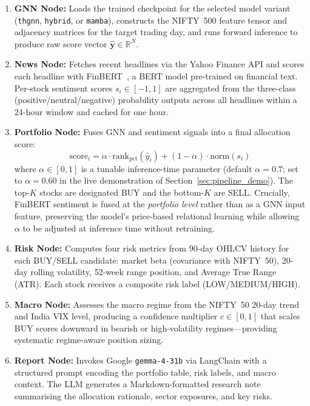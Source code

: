 \documentclass[a4paper,11pt]{report}
\begin{document}
\begin{enumerate}
    \item \textbf{GNN Node:} Loads the trained checkpoint for the selected model variant (\texttt{thgnn}, \texttt{hybrid}, or \texttt{mamba}), constructs the NIFTY~500 feature tensor and adjacency matrices for the target trading day, and runs forward inference to produce raw score vector $\hat{\mathbf{y}} \in \mathbb{R}^N$.

    \item \textbf{News Node:} Fetches recent headlines via the Yahoo Finance API and scores each headline with FinBERT~\cite{araci2019finbert}, a BERT model pre-trained on financial text. Per-stock sentiment scores $s_i \in [-1,1]$ are aggregated from the three-class (positive/neutral/negative) probability outputs across all headlines within a 24-hour window and cached for one hour.

    \item \textbf{Portfolio Node:} Fuses GNN and sentiment signals into a final allocation score:
    \begin{equation}
    \text{score}_i = \alpha\cdot\text{rank}_{\text{pct}}(\hat{y}_i) + (1-\alpha)\cdot\text{norm}(s_i)
    \end{equation}
    where $\alpha \in [0,1]$ is a tunable inference-time parameter (default $\alpha=0.7$; set to $\alpha=0.60$ in the live demonstration of Section~\ref{sec:pipeline_demo}). The top-$K$ stocks are designated BUY and the bottom-$K$ are SELL. Crucially, FinBERT sentiment is fused at the \emph{portfolio level} rather than as a GNN input feature, preserving the model's price-based relational learning while allowing $\alpha$ to be adjusted at inference time without retraining.

    \item \textbf{Risk Node:} Computes four risk metrics from 90-day OHLCV history for each BUY/SELL candidate: market beta (covariance with NIFTY~50), 20-day rolling volatility, 52-week range position, and Average True Range (ATR). Each stock receives a composite risk label (LOW/MEDIUM/HIGH).

    \item \textbf{Macro Node:} Assesses the macro regime from the NIFTY~50 20-day trend and India VIX level, producing a confidence multiplier $c\in[0,1]$ that scales BUY scores downward in bearish or high-volatility regimes---providing systematic regime-aware position sizing.

    \item \textbf{Report Node:} Invokes Google \texttt{gemma-4-31b} via LangChain with a structured prompt encoding the portfolio table, risk labels, and macro context. The LLM generates a Markdown-formatted research note summarising the allocation rationale, sector exposures, and key risks.
\end{enumerate}
\end{document}
